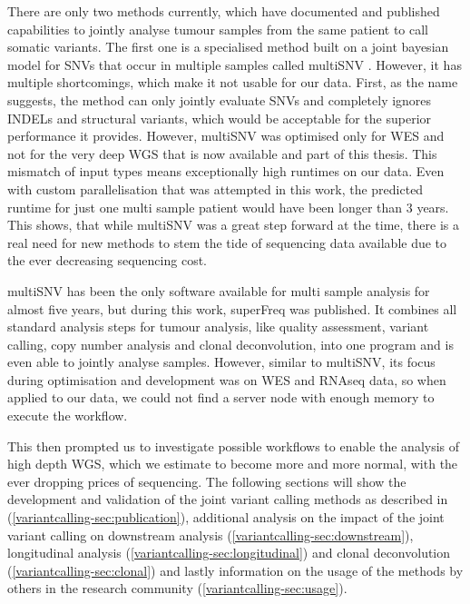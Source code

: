There are only two methods currently, which have documented and published capabilities to jointly analyse tumour samples from the same patient to call somatic variants. The first one is a specialised method built on a joint bayesian model for SNVs that occur in multiple samples called multiSNV \cite{Josephidou2015}. However, it has multiple shortcomings, which make it not usable for our data. First, as the name suggests, the method can only jointly evaluate SNVs and completely ignores INDELs and structural variants, which would be acceptable for the superior performance it provides. However, multiSNV was optimised only for WES and not for the very deep WGS that is now available and part of this thesis. This mismatch of input types means exceptionally high runtimes on our data. Even with custom parallelisation that was attempted in this work, the predicted runtime for just one multi sample patient would have been longer than 3 years. This shows, that while multiSNV was a great step forward at the time, there is a real need for new methods to stem the tide of sequencing data available due to the ever decreasing sequencing cost.

multiSNV has been the only software available for multi sample analysis for almost five years, but during this work, superFreq \cite{Flensburg2020} was published. It combines all standard analysis steps for tumour analysis, like quality assessment, variant calling, copy number analysis and clonal deconvolution, into one program and is even able to jointly analyse samples. However, similar to multiSNV, its focus during optimisation and development was on WES and RNAseq data, so when applied to our data, we could not find a server node with enough memory to execute the workflow.

This then prompted us to investigate possible workflows to enable the analysis of high depth WGS, which we estimate to become more and more normal, with the ever dropping prices of sequencing. The following sections will show the development and validation of the joint variant calling methods as described in \textcite{Hollizeck2021} (\autoref{variantcalling-sec:publication}), additional analysis on the impact of the joint variant calling on downstream analysis (\autoref{variantcalling-sec:downstream}), longitudinal analysis (\autoref{variantcalling-sec:longitudinal}) and clonal deconvolution (\autoref{variantcalling-sec:clonal}) and lastly information on the usage of the methods by others in the research community (\autoref{variantcalling-sec:usage}).

